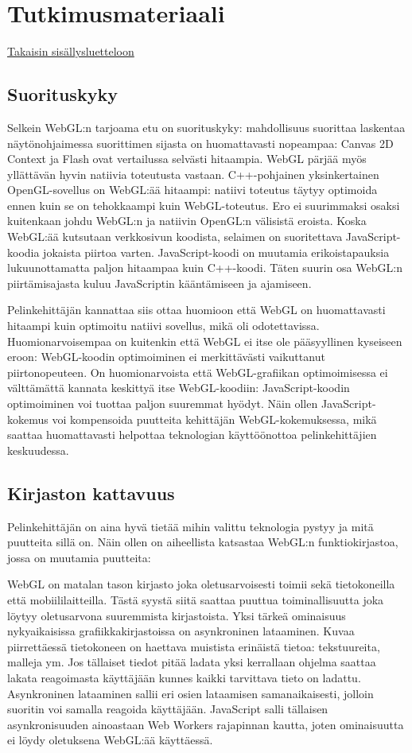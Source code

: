 \section{Tutkimusmateriaali}
\label{sec:materiaali}
\hyperlink{index}{Takaisin sisällysluetteloon}
\subsection{Suorituskyky}
Selkein WebGL:n tarjoama etu on suorituskyky: mahdollisuus suorittaa laskentaa näytönohjaimessa suorittimen sijasta on huomattavasti nopeampaa: Canvas 2D Context ja Flash ovat vertailussa selvästi hitaampia\cite{hoetzlein}. WebGL pärjää myös yllättävän hyvin natiivia toteutusta vastaan. C++-pohjainen yksinkertainen OpenGL-sovellus on WebGL:ää hitaampi: natiivi toteutus täytyy optimoida ennen kuin se on tehokkaampi kuin WebGL-toteutus\cite{hoetzlein}. Ero ei suurimmaksi osaksi kuitenkaan johdu WebGL:n ja natiivin OpenGL:n välisistä eroista. Koska WebGL:ää kutsutaan verkkosivun koodista, selaimen on suoritettava JavaScript-koodia jokaista piirtoa varten. JavaScript-koodi on muutamia erikoistapauksia lukuunottamatta paljon hitaampaa kuin C++-koodi\cite{smedberg}. Täten suurin osa WebGL:n piirtämisajasta kuluu JavaScriptin kääntämiseen ja ajamiseen\cite{hoetzlein}.

Pelinkehittäjän kannattaa siis ottaa huomioon että WebGL on huomattavasti hitaampi kuin optimoitu natiivi sovellus, mikä oli odotettavissa. Huomionarvoisempaa on kuitenkin että WebGL ei itse ole pääsyyllinen kyseiseen eroon: WebGL-koodin optimoiminen ei merkittävästi vaikuttanut piirtonopeuteen\cite{hoetzlein}. On huomionarvoista että WebGL-grafiikan optimoimisessa ei välttämättä kannata keskittyä itse WebGL-koodiin: JavaScript-koodin optimoiminen voi tuottaa paljon suuremmat hyödyt. Näin ollen JavaScript-kokemus voi kompensoida puutteita kehittäjän WebGL-kokemuksessa, mikä saattaa huomattavasti helpottaa teknologian käyttöönottoa pelinkehittäjien keskuudessa.

\subsection{Kirjaston kattavuus}
Pelinkehittäjän on aina hyvä tietää mihin valittu teknologia pystyy ja mitä puutteita sillä on. Näin ollen on aiheellista katsastaa WebGL:n funktiokirjastoa, jossa on muutamia puutteita\cite{dibenedettoSpider}:

WebGL on matalan tason kirjasto joka oletusarvoisesti toimii sekä tietokoneilla että mobiililaitteilla. Tästä syystä siitä saattaa puuttua toiminallisuutta joka löytyy oletusarvona suuremmista kirjastoista.
Yksi tärkeä ominaisuus nykyaikaisissa grafiikkakirjastoissa on asynkroninen lataaminen. Kuvaa piirrettäessä tietokoneen on haettava muistista erinäistä tietoa: tekstuureita, malleja ym. Jos tällaiset tiedot pitää ladata yksi kerrallaan ohjelma saattaa lakata reagoimasta käyttäjään kunnes kaikki tarvittava tieto on ladattu. Asynkroninen lataaminen sallii eri osien lataamisen samanaikaisesti, jolloin suoritin voi samalla reagoida käyttäjään. JavaScript salli tällaisen asynkronisuuden ainoastaan Web Workers rajapinnan kautta\cite{htmlwebworkers}, joten ominaisuutta ei löydy oletuksena WebGL:ää käyttäessä.

